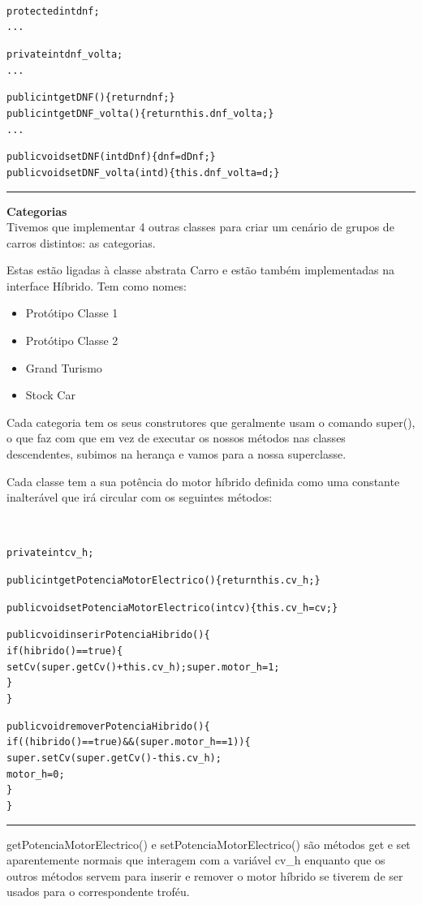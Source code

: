 \documentclass[10pt]{article}
\newenvironment{code}                    
{\textbf{
} \hspace{1cm} \hrulefill \\ 
\smallskip 
\begin{center}
\begin{minipage}{0.9\textwidth} 
\begin{alltt}\small}
{\end{alltt}
\end{minipage}
\end{center}
\hrule\smallskip
}
\begin{document}
\begin{code}
protected int dnf;
...

private int dnf_volta;
...

public int getDNF ()\{return dnf;\}
public int getDNF_volta ()\{return this.dnf_volta;\}
...

public void setDNF (int dDnf)\{dnf=dDnf;\}    
public void setDNF_volta (int d)\{this.dnf_volta=d;\}
\end{code}


\pagebreak
\textbf{Categorias}
\\
Tivemos que implementar 4 outras classes para criar um cenário de grupos de carros distintos: as categorias. 

Estas estão ligadas à classe abstrata Carro e estão também implementadas na interface Híbrido. Tem como nomes:

\begin{itemize}
\item Protótipo Classe 1
\item Protótipo Classe 2
\item Grand Turismo 
\item Stock Car
\end{itemize}

Cada categoria tem os seus construtores que geralmente usam o comando super(), o que faz com que em vez de executar os nossos métodos nas classes descendentes, subimos na herança e vamos para a nossa superclasse.

Cada classe tem a sua potência do motor híbrido definida como uma constante inalterável que irá circular com os seguintes métodos:

\begin{code}
  private int cv_h;
  
  
  public int getPotenciaMotorElectrico()\{return this.cv_h;\}
    
    public void setPotenciaMotorElectrico(int cv)\{this.cv_h=cv;\}
    
    public void inserirPotenciaHibrido()\{
        if (hibrido()==true)\{
            setCv(super.getCv() + this.cv_h);super.motor_h=1;
        \}
    \}
    
    public void removerPotenciaHibrido()\{
        if ((hibrido()==true)&&(super.motor_h==1))\{
            super.setCv(super.getCv() - this.cv_h);
            motor_h=0;
        \}
    \}

\end{code}
getPotenciaMotorElectrico() e setPotenciaMotorElectrico() são métodos get e set aparentemente normais que interagem com a variável cv\_h enquanto que os outros métodos servem para inserir e remover o motor híbrido se tiverem de ser usados para o correspondente troféu.
\end{document}
